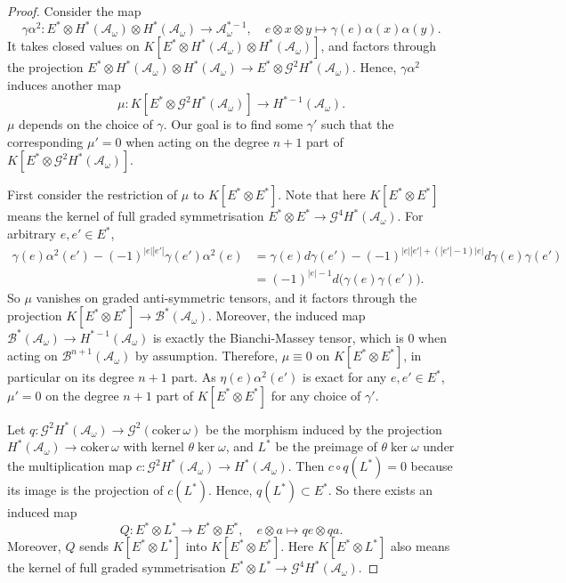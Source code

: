 \documentclass[10pt,a4paper]{amsart}
\begin{document}
\begin{proof}
Consider the map
$$
\gamma\alpha^2:E^*\otimes H^*(\mathcal{A}_{\omega}) \otimes H^*(\mathcal{A}_{\omega})\to \mathcal{A}_{\omega}^{*-1},\quad e\otimes x\otimes y\mapsto \gamma(e)\alpha(x)\alpha(y).
$$
It takes closed values on $K[E^*\otimes H^*(\mathcal{A}_{\omega}) \otimes H^*(\mathcal{A}_{\omega})]$, and factors through the projection $E^*\otimes H^*(\mathcal{A}_{\omega}) \otimes H^*(\mathcal{A}_{\omega})\to E^*\otimes \mathcal{G}^2H^*(\mathcal{A}_{\omega})$. Hence, $\gamma\alpha^2$ induces another map
$$
\mu:K[E^*\otimes \mathcal{G}^2H^*(\mathcal{A}_{\omega})]\to H^{*-1}(\mathcal{A}_{\omega}).
$$
$\mu$ depends on the choice of $\gamma$. Our goal is to find some $\gamma'$ such that the corresponding $\mu'=0$ when acting on the degree $n+1$ part of $K[E^*\otimes \mathcal{G}^2H^*(\mathcal{A}_{\omega})]$.

First consider the restriction of $\mu$ to $K[E^*\otimes E^*]$. Note that here $K[E^*\otimes E^*]$ means the kernel of full graded symmetrisation $E^*\otimes E^*\to \mathcal{G}^4H^*(\mathcal{A}_{\omega})$. For arbitrary $e,e'\in E^*$,
\begin{align*}
\gamma(e)\alpha^2(e')-(-1)^{|e||e'|}\gamma(e')\alpha^2(e) &= \gamma(e)d\gamma(e')-(-1)^{|e||e'|+(|e'|-1)|e|}d\gamma(e)\gamma(e') \\
&= (-1)^{|e|-1}d\big(\gamma(e)\gamma(e')\big).
\end{align*}
So $\mu$ vanishes on graded anti-symmetric tensors, and it factors through the projection $K[E^*\otimes E^*]\to\mathcal{B}^*(\mathcal{A_{\omega}})$. Moreover, the induced map $\mathcal{B}^*(\mathcal{A_{\omega}})\to H^{*-1}(\mathcal{A}_{\omega})$ is exactly the Bianchi-Massey tensor, which is 0 when acting on $\mathcal{B}^{n+1}(\mathcal{A_{\omega}})$ by assumption. Therefore, $\mu\equiv 0$ on $K[E^*\otimes E^*]$, in particular on its degree $n+1$ part. As $\eta(e)\alpha^2(e')$ is exact for any $e,e'\in E^*$, $\mu'=0$ on the degree $n+1$ part of $K[E^*\otimes E^*]$ for any choice of $\gamma'$.

Let $q:\mathcal{G}^2H^*(\mathcal{A}_{\omega})\to \mathcal{G}^2(\text{coker}\,\omega)$ be the morphism induced by the projection $H^*(\mathcal{A}_{\omega})\to \text{coker}\,\omega$ with kernel $\theta\ker\omega$, and $L^*$ be the preimage of $\theta\ker\omega$ under the multiplication map $c:\mathcal{G}^2H^*(\mathcal{A}_{\omega})\to H^*(\mathcal{A}_{\omega})$. Then $c\circ q(L^*)=0$ because its image is the projection of $c(L^*)$. Hence, $q(L^*)\subset E^*$. So there exists an induced map
$$
Q: E^*\otimes L^*\to E^*\otimes E^*,\quad e\otimes a\mapsto qe\otimes qa.
$$
Moreover, $Q$ sends $K[E^*\otimes L^*]$ into $K[E^*\otimes E^*]$. Here $K[E^*\otimes L^*]$ also means the kernel of full graded symmetrisation $E^*\otimes L^*\to \mathcal{G}^4H^*(\mathcal{A}_{\omega})$.


\end{proof}
\end{document}
